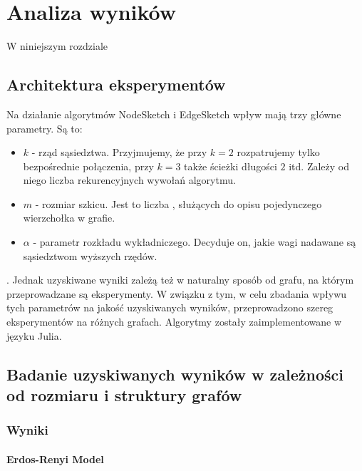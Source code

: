 \chapter{Analiza wyników}

    W niniejszym rozdziale 

\section{Architektura eksperymentów}

    Na działanie algorytmów NodeSketch i EdgeSketch wpływ mają trzy główne parametry. Są to:
    \begin{itemize}
        \item $k$ - rząd sąsiedztwa. Przyjmujemy, że przy $k = 2$ rozpatrujemy tylko bezpośrednie połączenia, przy $k = 3$ także ścieżki długości $2$ itd. Zależy od niego liczba rekurencyjnych wywołań algorytmu.
        \item $m$ - rozmiar szkicu. Jest to liczba , służących do opisu pojedynczego wierzchołka w grafie. 
        \item $\alpha$ - parametr rozkładu wykładniczego. Decyduje on, jakie wagi nadawane są sąsiedztwom wyższych rzędów.
    \end{itemize}

    . Jednak uzyskiwane wyniki zależą też w naturalny sposób od grafu, na którym przeprowadzane są eksperymenty. W związku z tym, w celu zbadania wpływu tych parametrów na jakość uzyskiwanych wyników, przeprowadzono szereg eksperymentów na różnych grafach. Algorytmy zostały zaimplementowane w języku Julia.

\section{Badanie uzyskiwanych wyników w zależności od rozmiaru i struktury grafów}
    \subsection{Wyniki}
    \subsubsection{Erdos-Renyi Model}

